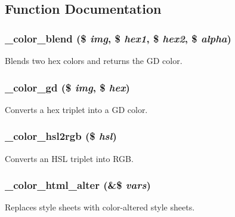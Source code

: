 \subsection{Function Documentation}
\hypertarget{color_8module_a06c2b0a7394a29e34dd9499bc440b94c}{
\subsubsection[{\_\-color\_\-blend}]{\setlength{\rightskip}{0pt plus 5cm}\_\-color\_\-blend (\$ {\em img}, \/  \$ {\em hex1}, \/  \$ {\em hex2}, \/  \$ {\em alpha})}}
\label{color_8module_a06c2b0a7394a29e34dd9499bc440b94c}
Blends two hex colors and returns the GD color. \hypertarget{color_8module_ac3717db6e9a7aefc73041cf66d5b5a28}{
\subsubsection[{\_\-color\_\-gd}]{\setlength{\rightskip}{0pt plus 5cm}\_\-color\_\-gd (\$ {\em img}, \/  \$ {\em hex})}}
\label{color_8module_ac3717db6e9a7aefc73041cf66d5b5a28}
Converts a hex triplet into a GD color. \hypertarget{color_8module_abfa1f17c627b57e5cb9fc077abd35f73}{
\subsubsection[{\_\-color\_\-hsl2rgb}]{\setlength{\rightskip}{0pt plus 5cm}\_\-color\_\-hsl2rgb (\$ {\em hsl})}}
\label{color_8module_abfa1f17c627b57e5cb9fc077abd35f73}
Converts an HSL triplet into RGB. \hypertarget{color_8module_a42c1a45b4c960ed52877b8724c8c1b08}{
\subsubsection[{\_\-color\_\-html\_\-alter}]{\setlength{\rightskip}{0pt plus 5cm}\_\-color\_\-html\_\-alter (\&\$ {\em vars})}}
\label{color_8module_a42c1a45b4c960ed52877b8724c8c1b08}
Replaces style sheets with color-\/altered style sheets.

